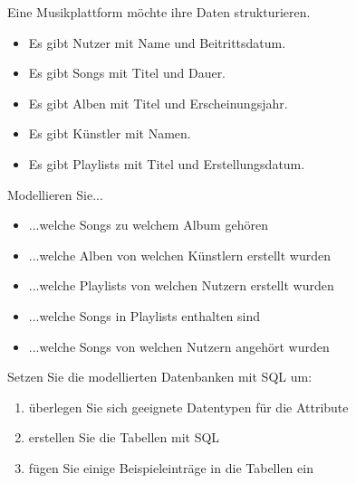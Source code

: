 \documentclass[11pt, a4paper, oneside]{article}
\begin{document}
	Eine Musikplattform möchte ihre Daten strukturieren.
	\begin{itemize}
		\item Es gibt Nutzer mit Name und Beitrittsdatum.
		\item Es gibt Songs mit Titel und Dauer.
		\item Es gibt Alben mit Titel und Erscheinungsjahr.
		\item Es gibt Künstler mit Namen.
		\item Es gibt Playlists mit Titel und Erstellungsdatum.
	\end{itemize}
	Modellieren Sie...
	\begin{itemize}
		\item ...welche Songs zu welchem Album gehören
		\item ...welche Alben von welchen Künstlern erstellt wurden
		\item ...welche Playlists von welchen Nutzern erstellt wurden
		\item ...welche Songs in Playlists enthalten sind
		\item ...welche Songs von welchen Nutzern angehört wurden
	\end{itemize}
	
	\boxarea[10cm]
	
	\pagebreak
	
	
	Setzen Sie die modellierten Datenbanken mit SQL um:
	\begin{enumerate}[label=\alph*)]
		\item überlegen Sie sich geeignete Datentypen für die Attribute
		\item erstellen Sie die Tabellen mit SQL
		\item fügen Sie einige Beispieleinträge in die Tabellen ein
	\end{enumerate}
	
	\boxarea[18cm]
	
\end{document}
